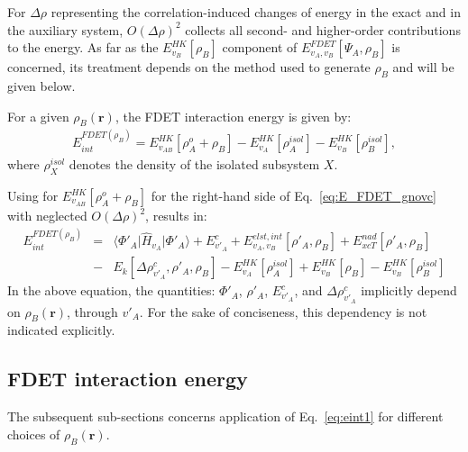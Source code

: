 \documentclass[journal=jctcce,manuscript=article]{achemso}
\newcommand{\nr}[1]{\color{red}#1\color{black}}
\begin{document}
For $\Delta\rho$  representing the correlation-induced changes of energy in the exact and in the auxiliary system, 
 $O(\Delta\rho)^2$ collects all second- and higher\nr{-}order contributions to the energy. 
As far as the $E^{HK}_{v_B}[\rho_B]$ component of ${ E}_{v_A,v_B}^{FDET}[\Psi_{A},\rho_B]$ is concerned,
its treatment depends on the method used to generate $\rho_B$ and will be given below.


For a given $\rho_B(\mathbf{r})$,
the FDET interaction energy is given by:
\begin{eqnarray}
E_{int}^{FDET(\rho_B)}=E_{v_{AB}}^{HK}[\rho_A^{o}+\rho_B] - E_{v_A}^{HK}[\rho_A^{isol}] - 
E_{v_B}^{HK}[\rho_B^{isol}],     \label{eq:eint0}
\end{eqnarray}
\nr{where $\rho_X^{isol}$ denotes the density of the isolated subsystem $X$.}

Using for  $E_{v_{AB}}^{HK}[\rho_A^{o}+\rho_B]$ for the right-hand side of Eq.~\ref{eq:E_FDET_gnovc} with  neglected $O(\Delta\rho)^2$, results in:
\begin{eqnarray}
E_{int}^{FDET(\rho_B)}&=&
\langle\Phi'_{A}\vert \hat{H}_{v_A}\vert \Phi'_{A}\rangle + E^{c}_{v'_A}
+ E^{elst,int}_{v_A,v_B}[\rho'_A,\rho_B] + {E}_{xcT}^{nad}[\rho'_A,\rho_B] \label{eq:eint1}\\
&-&     E_k[\Delta \rho^{c}_{v'_A}, \rho'_A, \rho_B]  - E_{v_A}^{HK}[\rho_A^{isol}] + {E}^{HK}_{v_B}[\rho_B]  - 
E_{v_B}^{HK}[\rho_B^{isol}] \nonumber
\end{eqnarray}
In the above equation,  the quantities:  $\Phi'_{A}$, $\rho'_A$, $E^{c}_{v'_A}$, and $\Delta \rho^{c}_{v'_A}$ \nr{implicitly } depend on $\rho_B(\mathbf{r})$\nr{, through  $v'_A$. For the sake of conciseness}, this dependency is not indicated explicitly. 
\subsection{FDET interaction energy}
The subsequent sub-sections concerns application of Eq.~\ref{eq:eint1} for different choices \nr{of } $\rho_B(\mathbf{r})$. 
\end{document}
